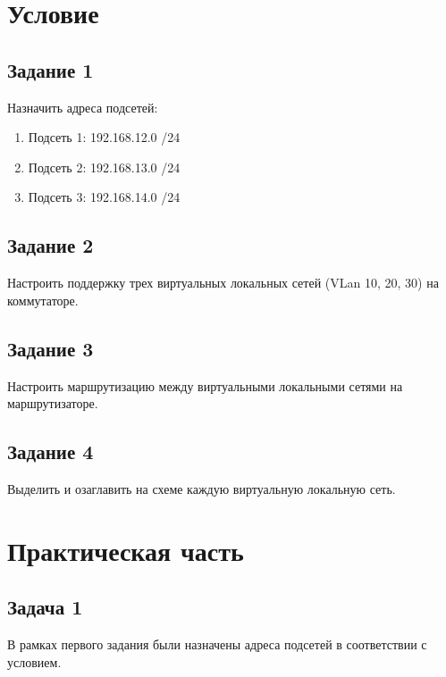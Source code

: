 \chapter{Условие}%
\label{cha:uslovie}

\section{Задание 1}
\label{sec:task_1}

Назначить адреса подсетей:

\begin{enumerate}
    \item Подсеть 1: 192.168.12.0 /24
    \item Подсеть 2: 192.168.13.0 /24
    \item Подсеть 3: 192.168.14.0 /24
\end{enumerate}

\section{Задание 2}
\label{sec:task_2}

Настроить поддержку трех виртуальных локальных сетей (VLan 10, 20, 30) на коммутаторе.

\section{Задание 3}
\label{sec:task_3}

Настроить маршрутизацию между виртуальными локальными сетями на маршрутизаторе.

\section{Задание 4}
\label{sec:task_4}

Выделить и озаглавить на схеме каждую виртуальную локальную сеть.

\chapter{Практическая часть}%
\label{cha:prakticheskaia_chast_}

\section{Задача 1}%
\label{sec:1}

В рамках первого задания были назначены адреса подсетей в соответствии с условием.


